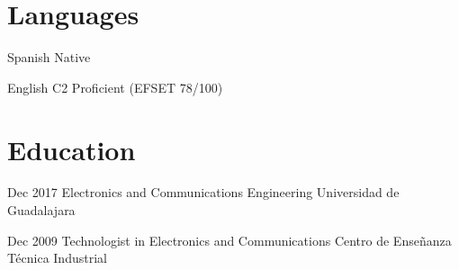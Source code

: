 \documentclass{resume} %
\begin{document}

\section{Languages}


\langitem
    {Spanish}
    {Native}


\langitem
    {English}
    {C2 Proficient (EFSET 78/100)}




\section{Education}


\eduitem
    {Dec 2017}
    {Electronics and Communications Engineering}
    {Universidad de Guadalajara}


\eduitem
    {Dec 2009}
    {Technologist in Electronics and Communications}
    {Centro de Enseñanza Técnica Industrial}


\end{document}
